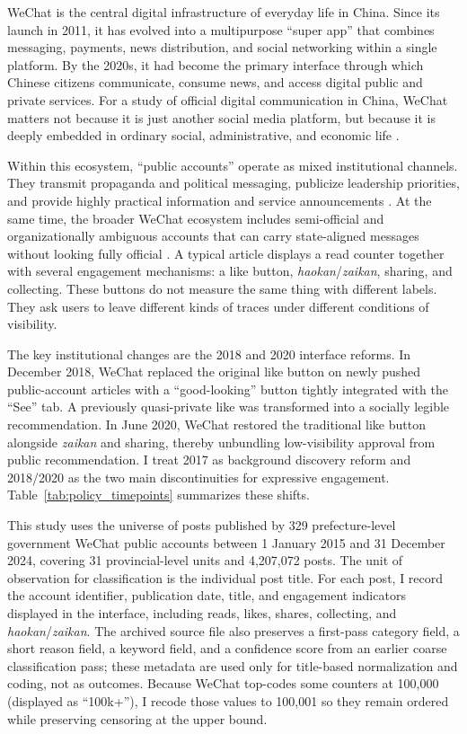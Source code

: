 \documentclass[12pt, american]{article}
\begin{document}
\begin{refsection}
WeChat is the central digital infrastructure of everyday life in China. Since its launch in 2011, it has evolved into a multipurpose ``super app'' that combines messaging, payments, news distribution, and social networking within a single platform. By the 2020s, it had become the primary interface through which Chinese citizens communicate, consume news, and access digital public and private services. For a study of official digital communication in China, WeChat matters not because it is just another social media platform, but because it is deeply embedded in ordinary social, administrative, and economic life \parencite{Ng2015,Roberts2020}.

Within this ecosystem, ``public accounts'' operate as mixed institutional channels. They transmit propaganda and political messaging, publicize leadership priorities, and provide highly practical information and service announcements \parencite{JiangEtAl2021,LiuMaXia2024,YuShen2026,Zheng2013,ZhengZheng2014}. At the same time, the broader WeChat ecosystem includes semi-official and organizationally ambiguous accounts that can carry state-aligned messages without looking fully official \parencite{Neagli2021}. A typical article displays a read counter together with several engagement mechanisms: a like button, \textit{haokan}/\textit{zaikan}, sharing, and collecting. These buttons do not measure the same thing with different labels. They ask users to leave different kinds of traces under different conditions of visibility.

The key institutional changes are the 2018 and 2020 interface reforms. In December 2018, WeChat replaced the original like button on newly pushed public-account articles with a ``good-looking'' button tightly integrated with the ``See'' tab. A previously quasi-private like was transformed into a socially legible recommendation. In June 2020, WeChat restored the traditional like button alongside \textit{zaikan} and sharing, thereby unbundling low-visibility approval from public recommendation. I treat 2017 as background discovery reform and 2018/2020 as the two main discontinuities for expressive engagement. Table~\ref{tab:policy_timepoints} summarizes these shifts.

This study uses the universe of posts published by 329 prefecture-level government WeChat public accounts between 1 January 2015 and 31 December 2024, covering 31 provincial-level units and 4,207,072 posts. The unit of observation for classification is the individual post title. For each post, I record the account identifier, publication date, title, and engagement indicators displayed in the interface, including reads, likes, shares, collecting, and \textit{haokan}/\textit{zaikan}. The archived source file also preserves a first-pass category field, a short reason field, a keyword field, and a confidence score from an earlier coarse classification pass; these metadata are used only for title-based normalization and coding, not as outcomes. Because WeChat top-codes some counters at 100,000 (displayed as ``100k+''), I recode those values to 100,001 so they remain ordered while preserving censoring at the upper bound.


\end{refsection}
\end{document}
